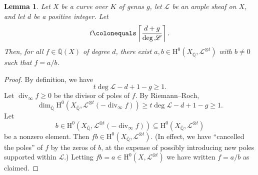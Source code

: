 \documentclass{amsproc}
\numberwithin{equation}{section}
\numberwithin{figure}{section}
\newtheorem{lemma}[equation]{Lemma}
\theoremstyle{definition}
\theoremstyle{remark}
\DeclareMathOperator{\opspan}{span}
\DeclareMathOperator{\opdiv}{div}
\newcommand{\Qbar}{\overline{\mathbb{Q}}}
\newcommand{\scrL}{\mathscr{L}}
\newcommand\Hzero{\mathrm{H}^0}
\renewcommand{\geq}{\geqslant}
\newcommand{\aj}[1]{{\color{magenta} \textsf{[[#1]]}}}
\begin{document}
\begin{lemma}\label{lem:m}
Let $X$ be a curve over $K$ of genus $g$, let $\scrL$ be an ample sheaf on $X$, and let $d$ be a positive integer.  Let
\begin{equation} \label{eqn:deft}
t \colonequals \left\lceil \frac{d+g}{\deg \scrL} \right\rceil. 
\end{equation}
Then, for all $f \in \Qbar(X)$ of degree $d$, there exist $a,b \in \mathrm{H}^0(X_{\Qbar},\scrL^{\otimes t})$ with $b\neq 0$ such that $f=a/b$.
\end{lemma}

\begin{proof}
By definition, we have
\begin{equation}\label{ineq}
t \deg \scrL - d + 1-g \geq 1.
\end{equation} 
Let $\opdiv_\infty f \geq 0$ be the divisor of poles of $f$.  By Riemann--Roch, 
\begin{equation}
\dim_{\Qbar} \Hzero(X_{\Qbar},\scrL^{\otimes t}(-\opdiv_\infty f)) \geq  t\deg \scrL - d + 1-g \geq 1.
\end{equation}
Let 
\[ b \in \Hzero(X_{\Qbar}, \scrL^{\otimes t}(-\opdiv_\infty f)) \subseteq \Hzero(X_{\Qbar},\scrL^{\otimes t}) \] 
be a nonzero element.  Then $fb \in \mathrm H^0(X_{\Qbar},\scrL^{\otimes t})$.  (In effect, we have ``cancelled the poles'' of $f$ by the zeros of $b$, at the expense of possibly introducing new poles supported within $\scrL$.)  Letting $fb=a \in \Hzero(X,\scrL^{\otimes t})$ we have written $f= a/b$ as claimed.
\end{proof}
\end{document}
